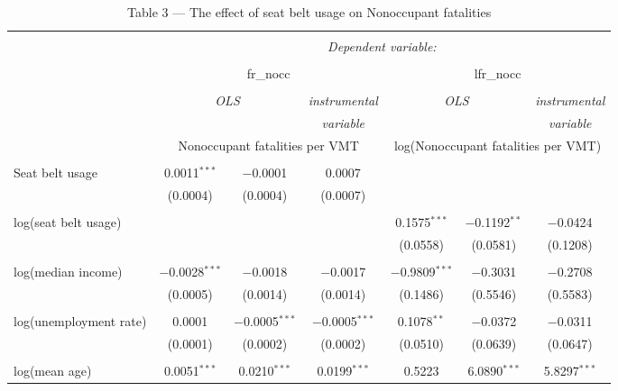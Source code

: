 
\begin{table}[!htbp] \centering 
  \caption{Table 3 --- The effect of seat belt usage on Nonoccupant fatalities} 
  \label{} 
\begin{tabular}{@{\extracolsep{5pt}}lcccccc} 
\\[-1.8ex]\hline 
\hline \\[-1.8ex] 
 & \multicolumn{6}{c}{\textit{Dependent variable:}} \\ 
\cline{2-7} 
\\[-1.8ex] & \multicolumn{3}{c}{fr\_nocc} & \multicolumn{3}{c}{lfr\_nocc} \\ 
\\[-1.8ex] & \multicolumn{2}{c}{\textit{OLS}} & \textit{instrumental} & \multicolumn{2}{c}{\textit{OLS}} & \textit{instrumental} \\ 
 & \multicolumn{2}{c}{\textit{}} & \textit{variable} & \multicolumn{2}{c}{\textit{}} & \textit{variable} \\ 
 & \multicolumn{3}{c}{Nonoccupant fatalities per VMT} & \multicolumn{3}{c}{log(Nonoccupant fatalities per VMT)} \\ 
\hline \\[-1.8ex] 
 Seat belt usage & 0.0011$^{***}$ & $-$0.0001 & 0.0007 &  &  &  \\ 
  & (0.0004) & (0.0004) & (0.0007) &  &  &  \\ 
  & & & & & & \\ 
 log(seat belt usage) &  &  &  & 0.1575$^{***}$ & $-$0.1192$^{**}$ & $-$0.0424 \\ 
  &  &  &  & (0.0558) & (0.0581) & (0.1208) \\ 
  & & & & & & \\ 
 log(median income) & $-$0.0028$^{***}$ & $-$0.0018 & $-$0.0017 & $-$0.9809$^{***}$ & $-$0.3031 & $-$0.2708 \\ 
  & (0.0005) & (0.0014) & (0.0014) & (0.1486) & (0.5546) & (0.5583) \\ 
  & & & & & & \\ 
 log(unemployment rate) & 0.0001 & $-$0.0005$^{***}$ & $-$0.0005$^{***}$ & 0.1078$^{**}$ & $-$0.0372 & $-$0.0311 \\ 
  & (0.0001) & (0.0002) & (0.0002) & (0.0510) & (0.0639) & (0.0647) \\ 
  & & & & & & \\ 
 log(mean age) & 0.0051$^{***}$ & 0.0210$^{***}$ & 0.0199$^{***}$ & 0.5223 & 6.0890$^{***}$ & 5.8297$^{***}$ \\ 

\end{tabular}
\end{table}
